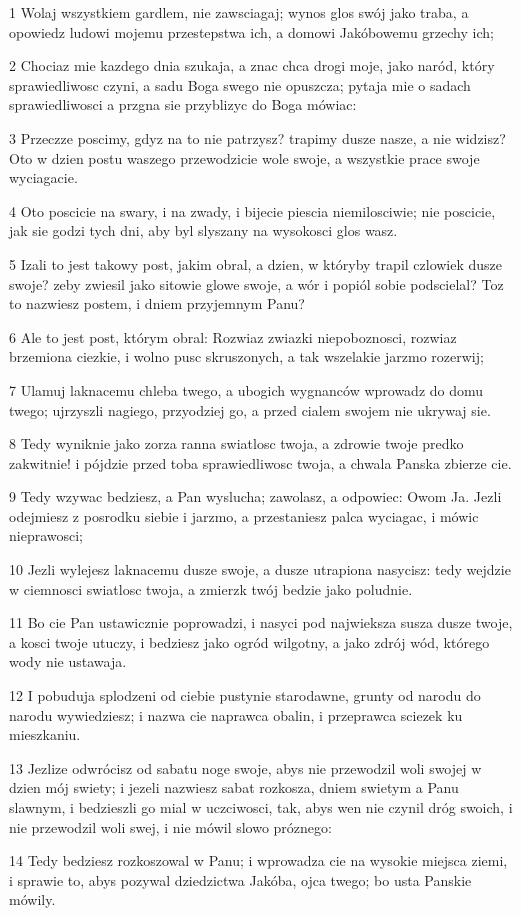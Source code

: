 \par 1 Wolaj wszystkiem gardlem, nie zawsciagaj; wynos glos swój jako traba, a opowiedz ludowi mojemu przestepstwa ich, a domowi Jakóbowemu grzechy ich;
\par 2 Chociaz mie kazdego dnia szukaja, a znac chca drogi moje, jako naród, który sprawiedliwosc czyni, a sadu Boga swego nie opuszcza; pytaja mie o sadach sprawiedliwosci a przgna sie przyblizyc do Boga mówiac:
\par 3 Przeczze poscimy, gdyz na to nie patrzysz? trapimy dusze nasze, a nie widzisz? Oto w dzien postu waszego przewodzicie wole swoje, a wszystkie prace swoje wyciagacie.
\par 4 Oto poscicie na swary, i na zwady, i bijecie piescia niemilosciwie; nie poscicie, jak sie godzi tych dni, aby byl slyszany na wysokosci glos wasz.
\par 5 Izali to jest takowy post, jakim obral, a dzien, w któryby trapil czlowiek dusze swoje? zeby zwiesil jako sitowie glowe swoje, a wór i popiól sobie podscielal? Toz to nazwiesz postem, i dniem przyjemnym Panu?
\par 6 Ale to jest post, którym obral: Rozwiaz zwiazki niepoboznosci, rozwiaz brzemiona ciezkie, i wolno pusc skruszonych, a tak wszelakie jarzmo rozerwij;
\par 7 Ulamuj laknacemu chleba twego, a ubogich wygnanców wprowadz do domu twego; ujrzyszli nagiego, przyodziej go, a przed cialem swojem nie ukrywaj sie.
\par 8 Tedy wyniknie jako zorza ranna swiatlosc twoja, a zdrowie twoje predko zakwitnie! i pójdzie przed toba sprawiedliwosc twoja, a chwala Panska zbierze cie.
\par 9 Tedy wzywac bedziesz, a Pan wyslucha; zawolasz, a odpowiec: Owom Ja. Jezli odejmiesz z posrodku siebie i jarzmo, a przestaniesz palca wyciagac, i mówic nieprawosci;
\par 10 Jezli wylejesz laknacemu dusze swoje, a dusze utrapiona nasycisz: tedy wejdzie w ciemnosci swiatlosc twoja, a zmierzk twój bedzie jako poludnie.
\par 11 Bo cie Pan ustawicznie poprowadzi, i nasyci pod najwieksza susza dusze twoje, a kosci twoje utuczy, i bedziesz jako ogród wilgotny, a jako zdrój wód, którego wody nie ustawaja.
\par 12 I pobuduja splodzeni od ciebie pustynie starodawne, grunty od narodu do narodu wywiedziesz; i nazwa cie naprawca obalin, i przeprawca sciezek ku mieszkaniu.
\par 13 Jezlize odwrócisz od sabatu noge swoje, abys nie przewodzil woli swojej w dzien mój swiety; i jezeli nazwiesz sabat rozkosza, dniem swietym a Panu slawnym, i bedzieszli go mial w uczciwosci, tak, abys wen nie czynil dróg swoich, i nie przewodzil woli swej, i nie mówil slowo próznego:
\par 14 Tedy bedziesz rozkoszowal w Panu; i wprowadza cie na wysokie miejsca ziemi, i sprawie to, abys pozywal dziedzictwa Jakóba, ojca twego; bo usta Panskie mówily.

